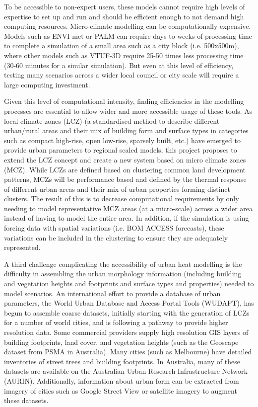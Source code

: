 To be accessible to non-expert users, these models cannot require high levels of expertise to set up and run and should be efficient enough to not demand high computing resources. Micro-climate modelling can be computationally expensive. Models such as ENVI-met or PALM can require days to weeks of processing time to complete a simulation of a small area such as a city block (i.e. 500x500m), where other models such as VTUF-3D require 25-50 times less processing time (30-60 minutes for a similar simulation). But even at this level of efficiency, testing many scenarios across a wider local council or city scale will require a large computing investment. 

Given this level of computational intensity, finding efficiencies in the modelling processes are essential to allow wider and more accessible usage of these tools. As local climate zones \cite{Stewart2012b} (LCZ) (a standardised method to describe different urban/rural areas and their mix of building form and surface types in categories such as compact high-rise, open low-rise, sparsely built, etc.) have emerged to provide urban parameters to regional scaled models, this project proposes to extend the LCZ concept and create a new system based on micro climate zones (MCZ)\cite{Nice2020b}. While LCZs are defined based on clustering common land development patterns, MCZs will be performance based and defined by the thermal response of different urban areas and their mix of urban properties forming distinct clusters. The result of this is to decrease computational requirements by only needing to model representative MCZ areas (at a micro-scale) across a wider area instead of having to model the entire area. In addition, if the simulation is using forcing data with spatial variations (i.e. BOM ACCESS forecasts), these variations can be included in the clustering to ensure they are adequately represented.

A third challenge complicating the accessibility of urban heat modelling is the difficulty in assembling the urban morphology information (including building and vegetation heights and footprints and surface types and properties) needed to model scenarios. An international effort to provide a database of urban parameters, the World Urban Database and Access Portal Tools (WUDAPT)\cite{Ching2018}, has begun to assemble coarse datasets, initially starting with the generation of LCZs\cite{Stewart2012b} for a number of world cities, and is following a pathway to provide higher resolution data\cite{Ching2019}. Some commercial providers supply high resolution GIS layers of building footprints, land cover, and vegetation heights (such as the Geoscape dataset from PSMA in Australia). Many cities (such as Melbourne\cite{CBDMelbourne2020}) have detailed inventories of street trees and building footprints. In Australia, many of these datasets are available on the Australian Urban Research Infrastructure Network (AURIN)\cite{Sinnott2015}. Additionally, information about urban form can be extracted from imagery of cities such as Google Street View or satellite imagery\cite{Middel2018,Middel2019,Nice2020} to augment these datasets. 

